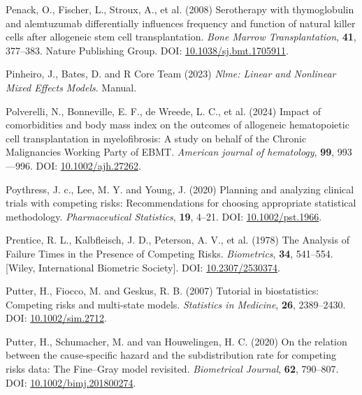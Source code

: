 \documentclass[
  letterpaper,
  DIV=11,
  numbers=noendperiod]{scrreprt}
\newlength{\cslhangindent}
\newlength{\cslentryspacingunit} %
\newenvironment{CSLReferences}[2] %
 {%
  \setlength{\parindent}{0pt}
  \ifodd #1
  \let\oldpar\par
  \def\par{\hangindent=\cslhangindent\oldpar}
  \fi
  \setlength{\parskip}{#2\cslentryspacingunit}
 }%
 {}
\begin{document}
\begin{CSLReferences}{1}{0}
\leavevmode{}%
Penack, O., Fischer, L., Stroux, A., et al. (2008) Serotherapy with
thymoglobulin and alemtuzumab differentially influences frequency and
function of natural killer cells after allogeneic stem cell
transplantation. \emph{Bone Marrow Transplantation}, \textbf{41},
377--383. Nature Publishing Group. DOI:
\href{https://doi.org/10.1038/sj.bmt.1705911}{10.1038/sj.bmt.1705911}.

\leavevmode{}%
Pinheiro, J., Bates, D. and R Core Team (2023) \emph{Nlme: {Linear} and
Nonlinear Mixed Effects Models}. Manual.

\leavevmode{}%
Polverelli, N., Bonneville, E. F., de Wreede, L. C., et al. (2024)
Impact of comorbidities and body mass index on the outcomes of
allogeneic hematopoietic cell transplantation in myelofibrosis: {A}
study on behalf of the {Chronic Malignancies Working Party} of {EBMT}.
\emph{American journal of hematology}, \textbf{99}, 993---996. DOI:
\href{https://doi.org/10.1002/ajh.27262}{10.1002/ajh.27262}.

\leavevmode{}%
Poythress, J. c., Lee, M. Y. and Young, J. (2020) Planning and analyzing
clinical trials with competing risks: {Recommendations} for choosing
appropriate statistical methodology. \emph{Pharmaceutical Statistics},
\textbf{19}, 4--21. DOI:
\href{https://doi.org/10.1002/pst.1966}{10.1002/pst.1966}.

\leavevmode{}%
Prentice, R. L., Kalbfleisch, J. D., Peterson, A. V., et al. (1978) The
{Analysis} of {Failure Times} in the {Presence} of {Competing Risks}.
\emph{Biometrics}, \textbf{34}, 541--554. {[}Wiley, International
Biometric Society{]}. DOI:
\href{https://doi.org/10.2307/2530374}{10.2307/2530374}.

\leavevmode{}%
Putter, H., Fiocco, M. and Geskus, R. B. (2007) Tutorial in
biostatistics: Competing risks and multi-state models. \emph{Statistics
in Medicine}, \textbf{26}, 2389--2430. DOI:
\href{https://doi.org/10.1002/sim.2712}{10.1002/sim.2712}.

\leavevmode{}%
Putter, H., Schumacher, M. and van Houwelingen, H. C. (2020) On the
relation between the cause-specific hazard and the subdistribution rate
for competing risks data: {The Fine}--{Gray} model revisited.
\emph{Biometrical Journal}, \textbf{62}, 790--807. DOI:
\href{https://doi.org/10.1002/bimj.201800274}{10.1002/bimj.201800274}.


\end{CSLReferences}
\end{document}
